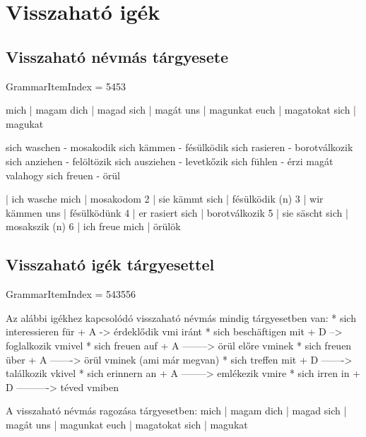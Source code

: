 \documentclass{article}
\newenvironment{desc}{\verbatim}{\endverbatim}
\newenvironment{exmp}{\verbatim}{\endverbatim}
\begin{document}
\section{Visszaható igék}

\subsection{Visszaható névmás tárgyesete}

GrammarItemIndex = 5453

\begin{desc}
mich | magam 
dich | magad 
sich | magát 
uns  | magunkat 
euch | magatokat 
sich | magukat 

sich waschen - mosakodik
sich kämmen - fésülködik
sich rasieren - borotválkozik
sich anziehen - felöltözik
sich ausziehen - levetkőzik
sich fühlen - érzi magát valahogy
sich freuen - örül
\end{desc}

\begin{exmp}
1 | ich wasche mich | mosakodom
2 | sie kämmt sich | fésülködik (n)
3 | wir kämmen uns | fésülködünk
4 | er rasiert sich | borotválkozik
5 | sie säscht sich | mosakszik (n)
6 | ich freue mich | örülök
\end{exmp}

\subsection{Visszaható igék tárgyesettel}

GrammarItemIndex = 543556

\begin{desc}
Az alábbi igékhez kapcsolódó visszaható névmás mindig tárgyesetben van:
* sich interessieren für + A -> érdeklődik vmi iránt
* sich beschäftigen mit + D --> foglalkozik vmivel
* sich freuen auf + A --------> örül előre vminek
* sich freuen über + A -------> örül vminek (ami már megvan)
* sich treffen mit + D -------> találkozik vkivel
* sich erinnern an + A --------> emlékezik vmire
* sich irren in + D ----------> téved vmiben

A visszaható névmás ragozása tárgyesetben:
mich | magam
dich | magad
sich | magát
uns  | magunkat
euch | magatokat
sich | magukat
\end{desc}
\end{document}
